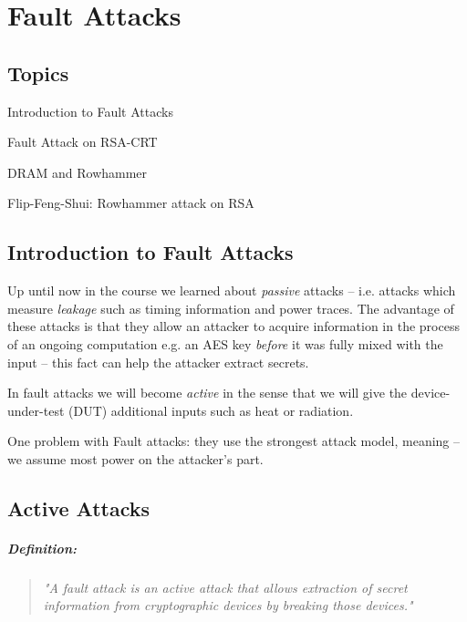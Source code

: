\chapter{Fault Attacks} \label{c9_ninthchapter:cha}

\begin{centering}
	\section*{Topics}
		\begin{enumerate}
		\end{enumerate}
\end{centering}
\newpage
\section*{Introduction to Fault Attacks}
Up until now in the course we learned about \emph{passive} attacks -- i.e. attacks which measure \emph{leakage} such as timing information and power traces. The advantage of these attacks is that they allow an attacker to acquire information in the process of an ongoing computation e.g. an AES key \emph{before} it was fully mixed with the input -- this fact can help the attacker extract secrets.

In fault attacks we will become \emph{active} in the sense that we will give the device-under-test (DUT) additional inputs such as heat or radiation.

One problem with Fault attacks: they use the strongest attack model, meaning -- we assume most power on the attacker's part.

\section{Active Attacks}
\paragraph{Definition:}
\begin{quote}
	\textit{"A fault attack is an active attack that allows extraction of secret information from cryptographic devices by breaking those devices."}
\end{quote}

